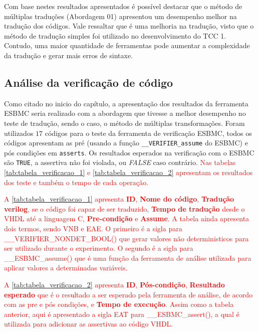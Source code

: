 Com base nestes resultados apresentados é possível destacar que o método de múltiplas traduções (Abordagem 01) apresentou um desempenho melhor na tradução dos códigos. Vale ressaltar que é uma melhoria na tradução, visto que o método de tradução simples foi utilizado no desenvolvimento do TCC 1. Contudo, uma maior quantidade de ferramentas pode aumentar a complexidade da tradução e gerar mais erros de sintaxe.

\subsection{Análise da verificação de código}
Como citado no inicio do capítulo, a apresentação dos resultados da ferramenta ESBMC seria realizado com a abordagem que tivesse a melhor desempenho no teste de tradução, sendo o caso, o método de múltiplas transformações. Foram utilizados $17$ códigos para o teste da ferramenta de verificação ESBMC, todos os códigos apresentam as pré (usando a função \texttt{\_\_VERIFIER\_assume} do ESBMC) e pós condições  em \texttt{asserts}. 
Os resultados esperados na verificação com o ESBMC são \texttt{TRUE}, a assertiva não foi violada, ou \textit{FALSE} caso contrário. \textcolor{red}{Nas tabelas \autoref{tab:tabela_verificacao_1} e \autoref{tab:tabela_verificacao_2} apresentam os resultados dos teste e também o tempo de cada operação.}

\par
\textcolor{red}{A \autoref{tab:tabela_verificacao_1} apresenta \textbf{ID}, \textbf{Nome do código}, \textbf{Tradução verilog}, se o código foi capaz de ser traduzido, \textbf{Tempo de tradução} desde o VHDL até a linguagem C, \textbf{Pre-condição} e \textbf{Assume}. A tabela ainda apresenta dois termos, sendo VNB e EAE. O primeiro é a sigla para \_\_VERIFIER\_NONDET\_BOOL() que gerar valores não deterministicos para ser utilizado durante o experimento. O segundo é a sigla para \_\_ESBMC\_assume() que é uma função da ferramenta de análise utilizada para aplicar valores a determinadas variáveis.} 

\par
\textcolor{red}{A \autoref{tab:tabela_verificacao_2} apresenta \textbf{ID}, \textbf{Pós-condição}, \textbf{Resultado esperado} que é o resultado a ser esperado pela ferramenta de análise, de acordo com as pre e pós condições, e \textbf{Tempo de execução}. Assim como a tabela anterior, aqui é apresentado a sigla EAT para \_\_ESBMC\_assert(), a qual é utilizada para adicionar as assertivas ao código VHDL.}

